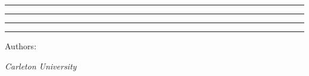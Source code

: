 
 
\begin{titlepage} %
	\centering %
	\vspace*{6\baselineskip} %
    
	\rule{\textwidth}{1.6pt}\vspace*{-\baselineskip}\vspace*{2pt} %
	\rule{\textwidth}{0.4pt} %
	\vspace{1.5\baselineskip} %

	{\DocTitle} %

	\vspace{1.5\baselineskip} %
	\rule{\textwidth}{0.4pt}\vspace*{-\baselineskip}\vspace{3.2pt} %
	\rule{\textwidth}{1.6pt} %

	\vspace{2\baselineskip} %
	{\large \DocSubTitle} %
	\vspace*{10\baselineskip} %
	
	Authors:

	\vspace{0.5\baselineskip} %
	{\scshape\Large\DocAuthors} %
	\vspace{0.5\baselineskip} %
	\textit{Carleton University} %

	\vfill
	{\large \DocDate}
\end{titlepage}